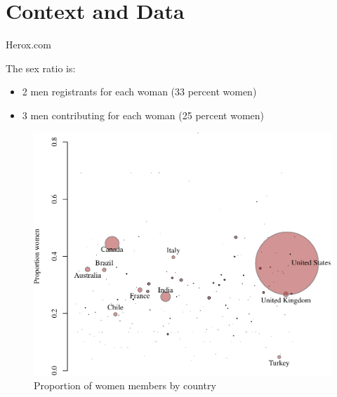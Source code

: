 \section{Context and Data}\label{context-and-data}

\begin{frame}{Herox.com}

The sex ratio is:

\begin{itemize}
\tightlist
\item
  2 men registrants for each woman (33 percent women)
\item
  3 men contributing for each woman (25 percent women)
\end{itemize}

\end{frame}

\begin{frame}

\begin{figure}
\centering
\includegraphics{report_slides_files/figure-beamer/bayes-1.pdf}
\caption{Proportion of women members by country}
\end{figure}

\end{frame}

